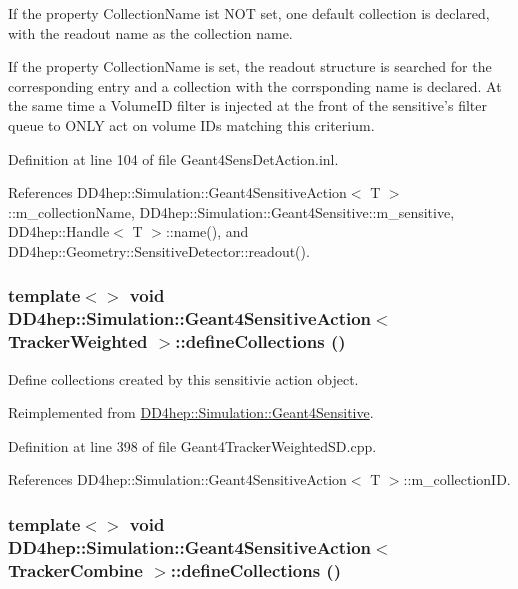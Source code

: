 \begin{DoxyItemize}
\item If the property CollectionName ist NOT set, one default collection is declared, with the readout name as the collection name.
\item If the property CollectionName is set, the readout structure is searched for the corresponding entry and a collection with the corrsponding name is declared. At the same time a VolumeID filter is injected at the front of the sensitive's filter queue to ONLY act on volume IDs matching this criterium. 
\end{DoxyItemize}

Definition at line 104 of file Geant4SensDetAction.inl.

References DD4hep::Simulation::Geant4SensitiveAction$<$ T $>$::m\_\-collectionName, DD4hep::Simulation::Geant4Sensitive::m\_\-sensitive, DD4hep::Handle$<$ T $>$::name(), and DD4hep::Geometry::SensitiveDetector::readout().\hypertarget{class_d_d4hep_1_1_simulation_1_1_geant4_sensitive_action_a0d2c4744420ef0f886d26e424d2357ba}{
\subsubsection[{defineCollections}]{\setlength{\rightskip}{0pt plus 5cm}template$<$$>$ void {\bf DD4hep::Simulation::Geant4SensitiveAction}$<$ {\bf TrackerWeighted} $>$::defineCollections ()}}
\label{class_d_d4hep_1_1_simulation_1_1_geant4_sensitive_action_a0d2c4744420ef0f886d26e424d2357ba}


Define collections created by this sensitivie action object. 

Reimplemented from \hyperlink{class_d_d4hep_1_1_simulation_1_1_geant4_sensitive_a88c872b79e49e399c8ee282960c2d77d}{DD4hep::Simulation::Geant4Sensitive}.

Definition at line 398 of file Geant4TrackerWeightedSD.cpp.

References DD4hep::Simulation::Geant4SensitiveAction$<$ T $>$::m\_\-collectionID.\hypertarget{class_d_d4hep_1_1_simulation_1_1_geant4_sensitive_action_a827b5e46eae9a7b69e91d6f0ee58733d}{
\subsubsection[{defineCollections}]{\setlength{\rightskip}{0pt plus 5cm}template$<$$>$ void {\bf DD4hep::Simulation::Geant4SensitiveAction}$<$ {\bf TrackerCombine} $>$::defineCollections ()}}
\label{class_d_d4hep_1_1_simulation_1_1_geant4_sensitive_action_a827b5e46eae9a7b69e91d6f0ee58733d}



